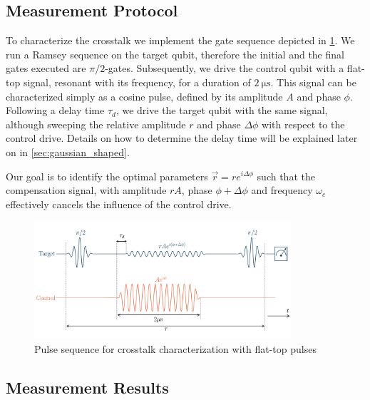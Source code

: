 \subsection{Measurement Protocol}

To characterize the crosstalk we implement the gate sequence depicted in \cref{fig:pulse_train_flattop}.
We run a Ramsey sequence on the target qubit, therefore the initial and the final gates executed are $\pi/2$-gates.
Subsequently, we drive the control qubit with a flat-top signal, resonant with its frequency, for a duration of $\SI{2}{\micro \second}$.
This signal can be characterized simply as a cosine pulse, defined by its amplitude $A$ and phase $\phi$.
Following a delay time $\tau_d$, we drive the target qubit with the same signal, although sweeping the relative amplitude $r$ and phase $\Delta \phi$ with respect to the control drive. 
Details on how to determine the delay time will be explained later on in \cref{sec:gaussian_shaped}.

Our goal is to identify the optimal parameters $\Vec{r} = r e^{i\Delta \phi}$ such that the compensation signal, with amplitude $rA$, phase $\phi + \Delta \phi$ and frequency $\omega_c$ effectively cancels the influence of the control drive.

\begin{figure}
    \centering
    \includegraphics[width=0.85\textwidth]{Images//Chap2.0/diagram_falttop.pdf}
    \vspace{-0.5cm}
    \caption{Pulse sequence for crosstalk characterization with flat-top pulses}
    \label{fig:pulse_train_flattop}
\end{figure}

\subsection{Measurement Results}


